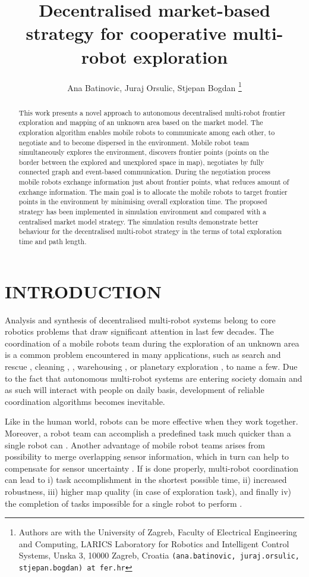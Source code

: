 \documentclass[letterpaper, 10 pt, conference]{ieeeconf}  %
\title{\LARGE \bf
Decentralised market-based strategy for cooperative multi-robot exploration 
}
\author{Ana Batinovic, Juraj Orsulic, Stjepan Bogdan
	\thanks{Authors are with the University of Zagreb, Faculty of Electrical Engineering  and Computing, LARICS Laboratory for Robotics and Intelligent Control Systems, Unska 3, 10000 Zagreb, Croatia
        {\tt\small (ana.batinovic, juraj.orsulic, stjepan.bogdan) at fer.hr}}}%
\begin{document}
\maketitle
\thispagestyle{empty}
\pagestyle{empty}


\begin{abstract}

This work presents a novel approach to autonomous decentralised multi-robot frontier exploration and mapping of an unknown area based on the market model. The exploration algorithm enables mobile robots to communicate among each other, to negotiate and to become dispersed in the environment. Mobile robot team simultaneously explores the environment, discovers frontier points (points on the border between the explored and unexplored space in map), negotiates by fully connected graph and event-based communication. During the negotiation process mobile robots exchange information just about frontier points, what reduces amount of exchange information. The main goal is to allocate the mobile robots to target frontier points in the environment by minimising overall exploration time. The proposed strategy has been implemented in simulation environment and compared with a centralised market model strategy. The simulation results demonstrate better behaviour for the decentralised multi-robot strategy in the terms of total exploration time and path length. 

\end{abstract}

 
\section{INTRODUCTION}
Analysis and synthesis of decentralised multi-robot systems belong to core robotics problems that draw significant attention in last few decades. The coordination of a mobile robots team during the exploration of an unknown area is a common problem encountered in many applications, such as search and rescue \cite{rescue}, cleaning \cite{cleaning1}, \cite{cleaning2}, warehousing \cite{Wurman}, or planetary exploration \cite{planetary}, to name a few. Due to the fact that autonomous multi-robot systems are entering society domain and as such will interact with people on daily basis, development of reliable coordination algorithms becomes inevitable.

 Like in the human world, robots can be more effective when they work together. Moreover, a robot team can accomplish a predefined task much quicker than a single robot can \cite{free-market}. Another advantage of mobile robot teams arises from possibility to merge overlapping sensor information, which in turn can help to compensate for sensor uncertainty \cite{segmentation}.
If is done properly, multi-robot coordination can lead to i) task accomplishment in the shortest possible time, ii) increased robustness, iii) higher map quality (in case of exploration task), and finally iv) the completion of tasks impossible for a single robot to perform \cite{survey-analysis}.
\end{document}
